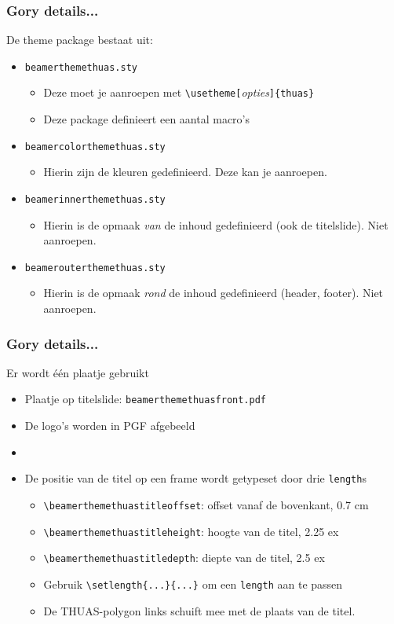 \documentclass[fleqn,aspectratio=169,dutch,10pt]{beamer}
\begin{document}
\begin{frame}[fragile]
\frametitle{Gory details...}
De theme package bestaat uit:
\begin{itemize}
\item \texttt{beamerthemethuas.sty}
\begin{itemize}
\item Deze moet je aanroepen met \lstinline|\usetheme[|\textsl{opties}\lstinline|]{thuas}|
\item Deze package definieert een aantal macro's
\end{itemize}
\item \texttt{beamercolorthemethuas.sty}
\begin{itemize}
\item Hierin zijn de kleuren gedefinieerd. Deze kan je aanroepen.
\end{itemize}
\item \texttt{beamerinnerthemethuas.sty}
\begin{itemize}
\item Hierin is de opmaak \emph{van} de inhoud gedefinieerd (ook de titelslide). Niet aanroepen.
\end{itemize}
\item \texttt{beamerouterthemethuas.sty}
\begin{itemize}
\item Hierin is de opmaak \emph{rond} de inhoud gedefinieerd (header, footer). Niet aanroepen.
\end{itemize}
\end{itemize}
\end{frame}


\begin{frame}[fragile]
\frametitle{Gory details...}
Er wordt \'e\'en plaatje gebruikt
\begin{itemize}
\item Plaatje op titelslide: \lstinline|beamerthemethuasfront.pdf|
\item De logo's worden in PGF afgebeeld
\item []
\item De positie van de titel op een frame wordt getypeset door drie \lstinline|length|s
\begin{itemize}
\item \lstinline|\beamerthemethuastitleoffset|: offset vanaf de bovenkant, 0.7 cm
\item \lstinline|\beamerthemethuastitleheight|: hoogte van de titel, 2.25 ex
\item \lstinline|\beamerthemethuastitledepth|: diepte van de titel, 2.5 ex
\item Gebruik \lstinline|\setlength{...}{...}| om een \lstinline|length| aan te passen
\item De THUAS-polygon links schuift mee met de plaats van de titel.
\end{itemize}
\end{itemize}
\end{frame}
\end{document}

